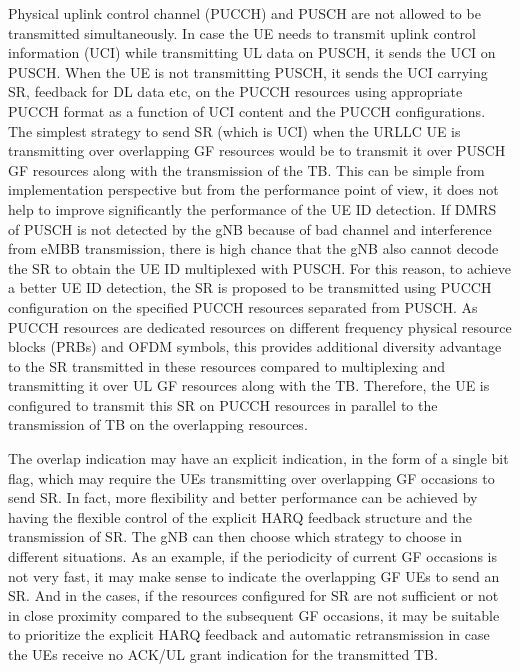 \documentclass[conference]{IEEEtran}
\begin{document}
Physical uplink control channel (PUCCH) and PUSCH are not allowed to be transmitted simultaneously. In case the UE needs to transmit uplink control information (UCI) while transmitting UL data on PUSCH, it sends the UCI on PUSCH. When the UE is not transmitting PUSCH, it sends the UCI carrying SR, feedback for DL data  etc, on the PUCCH resources using appropriate PUCCH format as a function of UCI content and the PUCCH configurations. The simplest strategy to send SR (which is UCI) when the URLLC UE is transmitting over overlapping GF resources would be to transmit it over PUSCH GF resources along with the transmission of the TB. This can be simple from implementation perspective but from the performance point of view, it does not help to improve significantly the performance of the UE ID detection. If DMRS of PUSCH is not detected by the gNB because of bad channel and interference from eMBB transmission, there is high chance that the gNB also cannot decode the SR to obtain the UE ID multiplexed with PUSCH. For this reason, to achieve a better UE ID detection, the SR is proposed to be transmitted using PUCCH configuration on the specified PUCCH resources separated from PUSCH. As PUCCH resources are dedicated resources on different frequency physical resource blocks (PRBs) and OFDM symbols, this provides additional diversity advantage to the SR transmitted in these resources compared to multiplexing and transmitting it over UL GF resources along with the TB. Therefore, the UE is configured to transmit this SR on PUCCH resources in parallel to the transmission of TB on the overlapping resources.

The overlap indication may have an explicit indication, in the form of a single bit flag, which may require the UEs transmitting over overlapping GF occasions to send SR. In fact, more flexibility and better performance can be achieved by having the flexible control of the explicit HARQ feedback structure and the transmission of SR. The gNB can then choose which strategy to choose in different situations. As an example, if the periodicity of current GF occasions is not very fast, it may make sense to indicate the overlapping GF UEs to send an SR. And in the cases, if the resources configured for SR are not sufficient or not in close proximity compared to the subsequent GF occasions, it may be suitable to prioritize the explicit HARQ feedback and automatic retransmission in case the UEs receive no ACK/UL grant indication for the transmitted TB.

\end{document}
